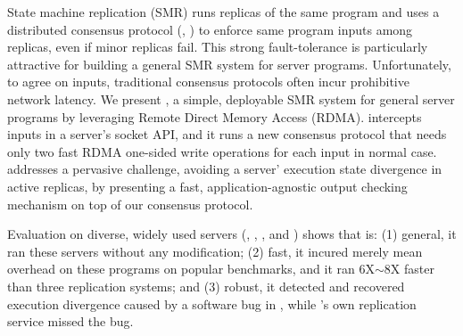 

State machine replication (SMR) runs replicas of the same program and 
uses a distributed consensus protocol (\eg, \paxos) to enforce same program 
inputs among replicas, even if minor replicas fail. This strong 
fault-tolerance is particularly attractive for building a general SMR system 
for server programs. Unfortunately, to agree on inputs, traditional consensus 
protocols often incur prohibitive network latency. We present \xxx, a simple, 
deployable SMR system for general server programs by leveraging Remote Direct 
Memory Access (RDMA). \xxx intercepts inputs in a server's socket API, and it 
runs a new \paxos consensus protocol that needs only two fast RDMA one-sided 
write operations for each input in normal case. \xxx addresses a pervasive 
challenge, avoiding a server' execution state divergence in active replicas, by 
presenting a fast, application-agnostic output checking mechanism on top of our 
consensus protocol.

Evaluation on \npopularprog diverse, widely used servers (\eg, \memcached, 
\mysql, and \clamav) shows that \xxx is: (1) general, it ran these servers 
without any modification; (2) fast, it incured merely \overhead mean overhead 
on these programs on popular benchmarks, and it ran 6X$\sim$8X faster than 
three replication systems; and (3) robust, it detected and recovered execution 
divergence caused by a software bug in \redis, while \redis's own replication 
service missed the bug.


